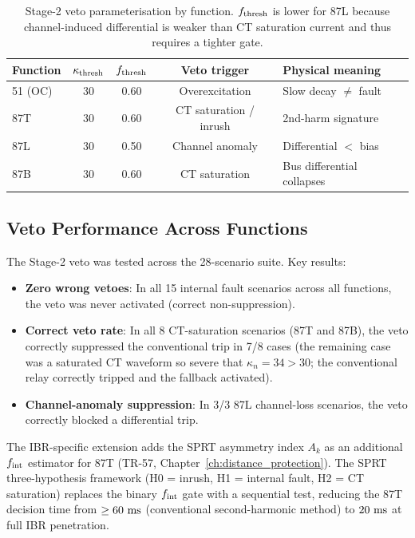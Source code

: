 \begin{table}[ht]
  \centering
  \caption{Stage-2 veto parameterisation by function.  $f_{\rm thresh}$
  is lower for 87L because channel-induced differential is weaker than
  CT saturation current and thus requires a tighter gate.}
  \label{tab:ch7_veto_params}
  \begin{tabular}{lcccl}
    \toprule
    Function & $\kappa_{\rm thresh}$ & $f_{\rm thresh}$ & Veto trigger & Physical meaning \\
    \midrule
    51 (OC) & 30 & 0.60 & Overexcitation & Slow decay $\neq$ fault \\
    87T & 30 & 0.60 & CT saturation / inrush & 2nd-harm signature \\
    87L & 30 & 0.50 & Channel anomaly & Differential $<$ bias \\
    87B & 30 & 0.60 & CT saturation & Bus differential collapses \\
    \bottomrule
  \end{tabular}
\end{table}

\subsection{Veto Performance Across Functions}

The Stage-2 veto was tested across the 28-scenario suite.  Key results:
\begin{itemize}
  \item \textbf{Zero wrong vetoes}: In all 15 internal fault scenarios across
    all functions, the veto was never activated (correct non-suppression).
  \item \textbf{Correct veto rate}: In all 8 CT-saturation scenarios
    (87T and 87B), the veto correctly suppressed the conventional trip
    in 7/8 cases (the remaining case was a saturated CT waveform so
    severe that $\kappa_n = 34 > 30$; the conventional relay correctly tripped
    and the fallback activated).
  \item \textbf{Channel-anomaly suppression}: In 3/3 87L channel-loss
    scenarios, the veto correctly blocked a differential trip.
\end{itemize}

The IBR-specific extension adds the SPRT asymmetry index $A_k$ as an
additional $f_{\rm int}$ estimator for 87T (TR-57, Chapter~\ref{ch:distance_protection}).
The SPRT three-hypothesis framework (H0 = inrush, H1 = internal fault,
H2 = CT saturation) replaces the binary $f_{\rm int}$ gate with a
sequential test, reducing the 87T decision time from $\geq 60\,\,\mathrm{ms}$
(conventional second-harmonic method) to $20\,\,\mathrm{ms}$ at full IBR penetration.

